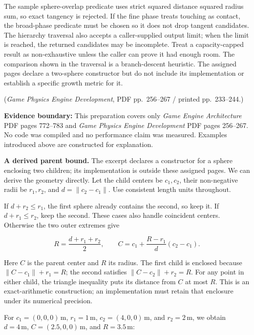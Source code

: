 The sample sphere-overlap predicate uses strict squared distance \BookInlineCode{{\textless{}}}{\textless{}} squared radius sum, so exact tangency is rejected. If the fine phase treats touching as contact, the broad-phase predicate must be chosen so it does not drop tangent candidates. The hierarchy traversal also accepts a caller-supplied output limit; when the limit is reached, the returned candidates may be incomplete. Treat a capacity-capped result as non-exhaustive unless the caller can prove it had enough room. The  comparison shown in the traversal is a branch-descent heuristic. The assigned pages declare a two-sphere constructor but do not include its implementation or establish a specific growth metric for it.

(\emph{Game Physics Engine Development}, PDF pp.~256--267 / printed pp.~233--244.)

\textbf{Evidence boundary:} This preparation covers only \emph{Game Engine Architecture} PDF pages 772--783 and \emph{Game Physics Engine Development} PDF pages 256--267. No code was compiled and no performance claim was measured. Examples introduced above are constructed for explanation.

\textbf{A derived parent bound.} The excerpt declares a constructor for a sphere enclosing two children; its implementation is outside these assigned pages. We can derive the geometry directly. Let the child centers be \(c_1,c_2\), their non-negative radii be \(r_1,r_2\), and \(d=\lVert c_2-c_1\rVert\). Use consistent length units throughout.

If \(d+r_2\leq r_1\), the first sphere already contains the second, so keep it. If \(d+r_1\leq r_2\), keep the second. These cases also handle coincident centers. Otherwise the two outer extremes give

\[
R=\frac{d+r_1+r_2}{2},\qquad
C=c_1+\frac{R-r_1}{d}(c_2-c_1).
\]

Here \(C\) is the parent center and \(R\) its radius. The first child is enclosed because \(\lVert C-c_1\rVert+r_1=R\); the second satisfies \(\lVert C-c_2\rVert+r_2=R\). For any point in either child, the triangle inequality puts its distance from \(C\) at most \(R\). This is an exact-arithmetic construction; an implementation must retain that enclosure under its numerical precision.

For \(c_1=(0,0,0)\,\mathrm m\), \(r_1=1\,\mathrm m\), \(c_2=(4,0,0)\,\mathrm m\), and \(r_2=2\,\mathrm m\), we obtain \(d=4\,\mathrm m\), \(C=(2.5,0,0)\,\mathrm m\), and \(R=3.5\,\mathrm m\):

